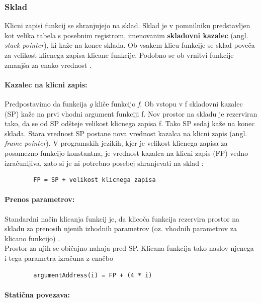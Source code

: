 \documentclass[a4paper, 12p]{book}
\begin{document}
\subsubsection{Sklad}

Klicni zapisi funkcij se shranjujejo na sklad. Sklad je v pomnilniku predstavljen kot velika tabela s posebnim registrom, imenovanim \textbf{skladovni kazalec} (angl. \textit{stack pointer}), ki kaže na konec sklada. Ob vsakem klicu funkcije se sklad poveča za velikost klicnega zapisa klicane funkcije. Podobno se ob vrnitvi funkcije zmanjša za enako vrednost \cite{modernCompiler}. 

\paragraph{Kazalec na klicni zapis:}

Predpostavimo da funkcija \textit{g} kliče funkcijo \textit{f}. Ob vstopu v f skladovni kazalec (SP) kaže na prvi vhodni argument funkciji f. Nov prostor na skladu je rezerviran tako, da se od SP odšteje velikost klicnega zapisa f. Tako SP sedaj kaže na konec sklada. Stara vrednost SP postane nova vrednost kazalca na klicni zapis (angl. \textit{frame pointer}). V programskih jezikih, kjer je velikost klicnega zapisa za posamezno funkcijo konstantna, je vrednost kazalca na klicni zapis (FP) vedno izračunljiva, zato si je ni potrebno posebej shranjevati na sklad \cite{modernCompiler}: 

\begin{lstlisting}
		FP = SP + velikost klicnega zapisa
\end{lstlisting}

\paragraph{Prenos parametrov:}

Standardni način klicanja funkcij je, da klicoča funkcija rezervira prostor na skladu za prenosih njenih izhodnih parametrov (oz. vhodnih parametrov za klicano funkcijo) \cite{modernCompiler}. \\ 
\indent Prostor za njih se običajno nahaja pred SP. Klicana funkcija tako naslov njenega i-tega parametra izračuna z enačbo
\begin{lstlisting}
		argumentAddress(i) = FP + (4 * i)
\end{lstlisting}

\paragraph{Statična povezava:}
\end{document}
